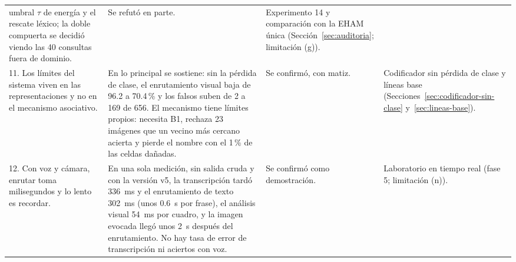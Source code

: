 \begin{table}[H]
\begin{tabular}{p{}p{}p{}p{}}
        umbral $\tau$ de energía y el rescate léxico; la doble compuerta se decidió
        viendo las 40 consultas fuera de dominio. &
        \raggedright Se refutó en parte. &
        \raggedright Experimento 14 y comparación con la EHAM única
        (Sección~\ref{sec:auditoria}; limitación (g)). \tabularnewline\addlinespace[4pt]
        \raggedright 11. Los límites del sistema viven en las representaciones y no en
        el mecanismo asociativo. &
        \raggedright En lo principal se sostiene: sin la pérdida de clase, el
        enrutamiento visual baja de 96.2 a 70.4\,\% y los falsos suben de 2 a 169 de 656.
        El mecanismo tiene límites propios: necesita B1, rechaza 23 imágenes que un
        vecino más cercano acierta y pierde el nombre con el 1\,\% de las celdas
        dañadas. &
        \raggedright Se confirmó, con matiz. &
        \raggedright Codificador sin pérdida de clase y líneas base
        (Secciones~\ref{sec:codificador-sin-clase} y~\ref{sec:lineas-base}).
        \tabularnewline\addlinespace[4pt]
        \raggedright 12. Con voz y cámara, enrutar toma milisegundos y lo lento es
        recordar. &
        \raggedright En una sola medición, sin salida cruda y con la versión v5, la
        transcripción tardó 336~ms y el enrutamiento de texto 302~ms (unos 0.6~s por
        frase), el análisis visual 54~ms por cuadro, y la imagen evocada llegó unos 2~s
        después del enrutamiento. No hay tasa de error de transcripción ni aciertos con
        voz. &
        \raggedright Se confirmó como demostración. &
        \raggedright Laboratorio en tiempo real (fase 5; limitación (n)). \tabularnewline
        \bottomrule
    \end{tabular}
\end{table}

